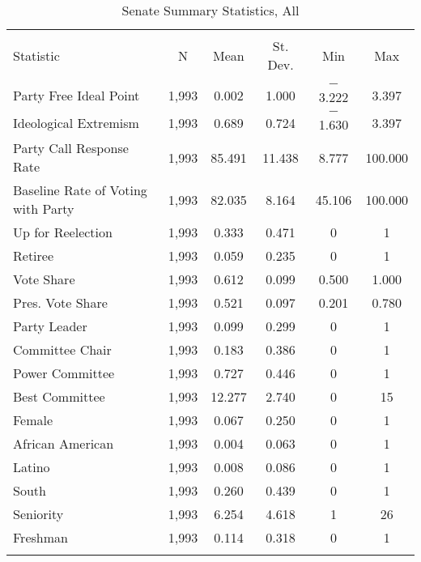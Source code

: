 \documentclass[12pt]{article}
\begin{document}
\begin{table}[H] 
	\centering 
	\singlespacing
	\caption{Senate Summary Statistics, All} 
	\label{} 
	\begin{tabular}{@{\extracolsep{5pt}}lccccc} 
		\\[-1.8ex]\hline 
		\hline \\[-1.8ex] 
		Statistic & \multicolumn{1}{c}{N} & \multicolumn{1}{c}{Mean} & \multicolumn{1}{c}{St. Dev.} & \multicolumn{1}{c}{Min} & \multicolumn{1}{c}{Max} \\ 
		\hline \\[-1.8ex] 
		Party Free Ideal Point & 1,993 & 0.002 & 1.000 & $-$3.222 & 3.397 \\ 
		Ideological Extremism & 1,993 & 0.689 & 0.724 & $-$1.630 & 3.397 \\ 
		Party Call Response Rate & 1,993 & 85.491 & 11.438 & 8.777 & 100.000 \\ 
		Baseline Rate of Voting with Party & 1,993 & 82.035 & 8.164 & 45.106 & 100.000 \\ 
		
		Up for Reelection & 1,993 & 0.333 & 0.471 & 0 & 1 \\ 
		Retiree & 1,993 & 0.059 & 0.235 & 0 & 1 \\ 
		Vote Share & 1,993 & 0.612 & 0.099 & 0.500 & 1.000 \\ 
		Pres. Vote Share & 1,993 & 0.521 & 0.097 & 0.201 & 0.780 \\ 
		Party Leader & 1,993 & 0.099 & 0.299 & 0 & 1 \\ 
		Committee Chair & 1,993 & 0.183 & 0.386 & 0 & 1 \\ 
		Power Committee & 1,993 & 0.727 & 0.446 & 0 & 1 \\ 
		Best Committee & 1,993 & 12.277 & 2.740 & 0 & 15 \\ 
		Female & 1,993 & 0.067 & 0.250 & 0 & 1 \\ 
		African American & 1,993 & 0.004 & 0.063 & 0 & 1 \\ 
		Latino & 1,993 & 0.008 & 0.086 & 0 & 1 \\ 
		South & 1,993 & 0.260 & 0.439 & 0 & 1 \\ 
		Seniority & 1,993 & 6.254 & 4.618 & 1 & 26 \\ 
		Freshman & 1,993 & 0.114 & 0.318 & 0 & 1 \\ 
		
		\hline \\[-1.8ex] 
	\end{tabular} 
\end{table} 
\end{document}
